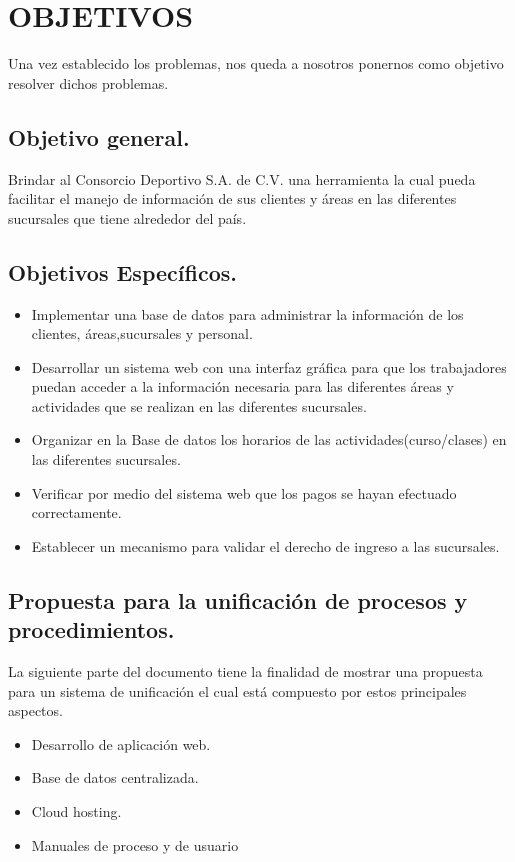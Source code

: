 \documentclass[12pt,letterpaper]{article}
\begin{document}
\section{OBJETIVOS}
Una vez establecido los problemas, nos queda a nosotros ponernos como objetivo resolver dichos problemas.
\subsection{Objetivo general.}
Brindar al Consorcio Deportivo S.A. de C.V. una herramienta la cual pueda facilitar el manejo de información de sus clientes y áreas en las diferentes sucursales que tiene alrededor del país.
\subsection{Objetivos Específicos.}
	\begin{itemize}
	
	\item Implementar una base de datos para administrar la información de los clientes, áreas,sucursales y personal.
	
	\item Desarrollar un sistema web con una interfaz gráfica para que los trabajadores puedan acceder a la información necesaria para las diferentes áreas y actividades que se realizan en las diferentes sucursales.

	\item Organizar en la Base de datos los horarios de las actividades(curso/clases) en las diferentes sucursales.
	
	\item Verificar por medio del sistema web que los pagos se hayan efectuado correctamente.	
	
	\item Establecer un mecanismo para validar el derecho de ingreso a las sucursales.
	
	\end{itemize}


\subsection*{Propuesta para  la  unificación de procesos y procedimientos.} 
La siguiente parte del documento tiene la finalidad de mostrar una propuesta para un sistema de unificación  el cual está compuesto por estos principales aspectos.

\begin{itemize}
    \item Desarrollo de aplicación web.
    \item Base de datos centralizada.
    \item Cloud hosting.
    \item Manuales de proceso y de usuario
\end{itemize}
\end{document}
